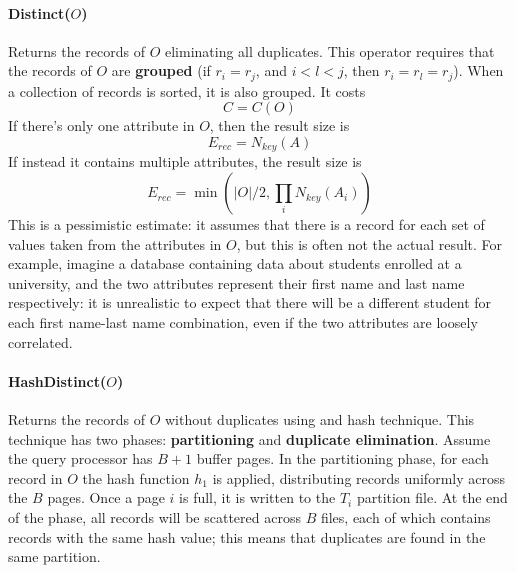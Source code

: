 \paragraph{Distinct($O$)}
Returns the records of $O$ eliminating all duplicates. This operator requires that the records of $O$ are \textbf{grouped} (if $r_i = r_j$, and $i < l < j$, then $r_i = r_l = r_j$). When a collection of records is sorted, it is also grouped. It costs
\begin{equation*}
    C = C(O)
\end{equation*}
If there's only one attribute in $O$, then the result size is
\begin{equation*}
    E_{rec} = N_{key}(A)
\end{equation*}
If instead it contains multiple attributes, the result size is
\begin{equation*}
    E_{rec} = \min(|O|/2, \prod_i N_{key}(A_i))
\end{equation*}
This is a pessimistic estimate: it assumes that there is a record for each set of values taken from the attributes in $O$, but this is often not the actual result. For example, imagine a database containing data about students enrolled at a university, and the two attributes represent their first name and last name respectively: it is unrealistic to expect that there will be a different student for each first name-last name combination, even if the two attributes are loosely correlated.

\paragraph{HashDistinct($O$)}
Returns the records of $O$ without duplicates using and hash technique. This technique has two phases: \textbf{partitioning} and \textbf{duplicate elimination}. Assume the query processor has $B+1$ buffer pages. In the partitioning phase, for each record in $O$ the hash function $h_1$ is applied, distributing records uniformly across the $B$ pages. Once a page $i$ is full, it is written to the $T_i$ partition file. At the end of the phase, all records will be scattered across $B$ files, each of which contains records with the same hash value; this means that duplicates are found in the same partition.


